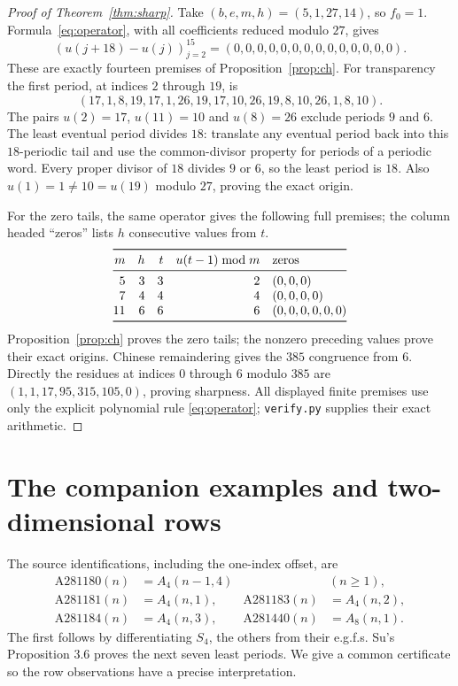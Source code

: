 \documentclass[11pt]{article}
\begin{document}
\begin{proof}[Proof of Theorem~\ref{thm:sharp}]
Take $(b,e,m,h)=(5,1,27,14)$, so $f_0=1$.
Formula~\eqref{eq:operator}, with all coefficients reduced modulo $27$,
gives
\[
 (u(j+18)-u(j))_{j=2}^{15}=(0,0,0,0,0,0,0,0,0,0,0,0,0,0).
\]
These are exactly fourteen premises of Proposition~\ref{prop:ch}.
For transparency the first period, at indices $2$ through $19$, is
\[
 (17,1,8,19,17,1,26,19,17,10,26,19,8,10,26,1,8,10).
\]
The pairs $u(2)=17$, $u(11)=10$ and $u(8)=26$ exclude periods
$9$ and $6$. The least eventual period divides $18$: translate any
eventual period back into this $18$-periodic tail and use the common-divisor
property for periods of a periodic word. Every proper divisor of $18$
divides $9$ or $6$, so the least period is $18$.
Also $u(1)=1\ne10=u(19)$ modulo $27$, proving the exact origin.

For the zero tails, the same operator gives the following full premises;
the column headed ``zeros'' lists $h$ consecutive values from $t$.
\[
\begin{array}{@{}rrrrl@{}}\toprule
 m&h&t&u(t-1)\bmod m&\text{zeros}\\\midrule
 5&3&3&2&(0,0,0)\\
 7&4&4&4&(0,0,0,0)\\
 11&6&6&6&(0,0,0,0,0,0)\\\bottomrule
\end{array}
\]
Proposition~\ref{prop:ch} proves the zero tails; the nonzero preceding
values prove their exact origins. Chinese remaindering gives the $385$
congruence from $6$. Directly the residues at indices $0$ through $6$
modulo $385$ are $(1,1,17,95,315,105,0)$, proving sharpness.
All displayed finite premises use only the explicit polynomial rule
\eqref{eq:operator}; \texttt{verify.py} supplies their exact arithmetic.
\end{proof}

\section{The companion examples and two-dimensional rows}
The source identifications, including the one-index offset, are
\begin{equation}\label{eq:family}
\begin{aligned}
 \mathrm{A281180}(n)&=A_4(n-1,4) &&(n\geq1),\\
 \mathrm{A281181}(n)&=A_4(n,1),&
 \mathrm{A281183}(n)&=A_4(n,2),\\
 \mathrm{A281184}(n)&=A_4(n,3),&
 \mathrm{A281440}(n)&=A_8(n,1).
\end{aligned}
\end{equation}
The first follows by differentiating $S_4$, the others from their e.g.f.s.
Su's Proposition 3.6 proves the next seven least periods. We give a
common certificate so the row observations have a precise interpretation.
\end{document}
